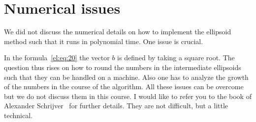 \section{Numerical issues}
\label{el:sec:numerical-issues}

We did not discuss the numerical details on how to implement the
ellipsoid method such that it runs in polynomial time. One issue is
crucial. 



 In the formula~\eqref{el:eq:20} the vector $b$ is defined by
 taking a square root. The question thus rises on how to round the
 numbers in the intermediate ellipsoids such that they can be handled
 on a machine.  Also one has to analyze the growth of the numbers in
 the course of the algorithm. All these issues  can be overcome but we
 do not discuss them in this course. I would like to refer you to the
 book of Alexander Schrijver~\cite{Schrijver86}  for further
 details. They are not difficult, but a little technical. 




%

%


